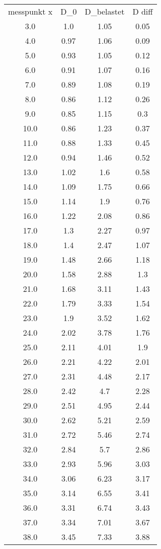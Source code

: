 \begin{table}
\begin{tabular}{cccc}
messpunkt x & D_0 & D_belastet & D diff \\
3.0 & 1.0 & 1.05 & 0.05 \\
4.0 & 0.97 & 1.06 & 0.09 \\
5.0 & 0.93 & 1.05 & 0.12 \\
6.0 & 0.91 & 1.07 & 0.16 \\
7.0 & 0.89 & 1.08 & 0.19 \\
8.0 & 0.86 & 1.12 & 0.26 \\
9.0 & 0.85 & 1.15 & 0.3 \\
10.0 & 0.86 & 1.23 & 0.37 \\
11.0 & 0.88 & 1.33 & 0.45 \\
12.0 & 0.94 & 1.46 & 0.52 \\
13.0 & 1.02 & 1.6 & 0.58 \\
14.0 & 1.09 & 1.75 & 0.66 \\
15.0 & 1.14 & 1.9 & 0.76 \\
16.0 & 1.22 & 2.08 & 0.86 \\
17.0 & 1.3 & 2.27 & 0.97 \\
18.0 & 1.4 & 2.47 & 1.07 \\
19.0 & 1.48 & 2.66 & 1.18 \\
20.0 & 1.58 & 2.88 & 1.3 \\
21.0 & 1.68 & 3.11 & 1.43 \\
22.0 & 1.79 & 3.33 & 1.54 \\
23.0 & 1.9 & 3.52 & 1.62 \\
24.0 & 2.02 & 3.78 & 1.76 \\
25.0 & 2.11 & 4.01 & 1.9 \\
26.0 & 2.21 & 4.22 & 2.01 \\
27.0 & 2.31 & 4.48 & 2.17 \\
28.0 & 2.42 & 4.7 & 2.28 \\
29.0 & 2.51 & 4.95 & 2.44 \\
30.0 & 2.62 & 5.21 & 2.59 \\
31.0 & 2.72 & 5.46 & 2.74 \\
32.0 & 2.84 & 5.7 & 2.86 \\
33.0 & 2.93 & 5.96 & 3.03 \\
34.0 & 3.06 & 6.23 & 3.17 \\
35.0 & 3.14 & 6.55 & 3.41 \\
36.0 & 3.31 & 6.74 & 3.43 \\
37.0 & 3.34 & 7.01 & 3.67 \\
38.0 & 3.45 & 7.33 & 3.88 \\

\end{tabular}
\end{table}
